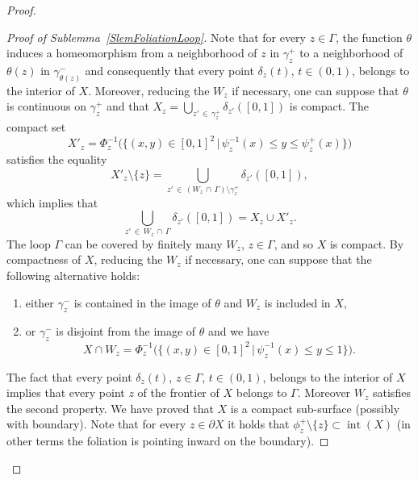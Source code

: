 \documentclass[10pt,a4paper]{article}
\theoremstyle{definition}
\theoremstyle{plain}
\numberwithin{equation}{section}
\numberwithin{figure}{section}
\DeclareMathOperator{\intt}{int}
\begin{document}
\begin{proof}
\begin{proof}[Proof of Sublemma~\ref{SlemFoliationLoop}]
Note that for every $z\in\Gamma$, the function $\theta$ induces a homeomorphism from a neighborhood of $z$ in $\gamma_z^{+}$ to a neighborhood of $\theta(z)$ in $\gamma_{\theta(z)}^{-}$ and consequently that every point $\delta_z(t)$, $ t\in(0,1)$, belongs to the interior of $X$. Moreover, reducing the $W_z$ if necessary, one can suppose that $\theta$ is continuous on $\gamma_z^{+}$ and that $X_z=\bigcup_{z'\,\in\,\gamma_z^{+}} \delta_{z'}([0,1])$ is compact. The compact set
\[
X'_z=\Phi^{-1}_z\Big(\big\{(x,y)\in[0,1]^2\,\big|\, \psi_{z}^{-1}(x)\leq y\leq \psi_z^{+}(x)\big\}\Big)
\]
satisfies the equality
\[
X'_z\setminus\{z\}= \bigcup_{z'\,\in\,(W_z\,\cap\,\Gamma)\setminus \gamma_z^{+}} \delta_{z'}([0,1]),
\]
which implies that
\[
\bigcup_{z'\,\in\,W_z\,\cap\,\Gamma} \delta_{z'}([0,1])= X_z\cup X'_z.
\]
The loop $\Gamma$ can be covered by finitely many $W_z$, $z\in\Gamma$, and so $X$ is compact. By compactness of $X$, reducing the $W_z$ if necessary, one can suppose that the following alternative holds:
\begin{enumerate}
\item either $\gamma^-_z$ is contained in the image of $\theta$ and $W_z$ is included in $X$,

\item or $\gamma^-_z$ is disjoint from the image of $\theta$ and we have
\[
X\cap W_z=\Phi^{-1}_z\Big(\big\{(x,y)\in[0,1]^2\,\big|\, \psi_{z}^{-1}(x)\leq y\leq 1\big\}\Big).
\]
\end{enumerate}
The fact that every point $\delta_z(t)$, $z\in\Gamma$, $ t\in(0,1)$, belongs to the interior of $X$ implies that every point $z$ of the frontier of $X$ belongs to $\Gamma$. Moreover $W_z$ satisfies the second property. We have proved that $X$ is a compact sub-surface (possibly with boundary). Note that for every $z\in\partial X$ it holds that $\phi_z^+\setminus\{z\}\subset \intt(X)$ (in other terms the foliation is pointing inward on the boundary).


\end{proof}
\end{proof}
\end{document}
